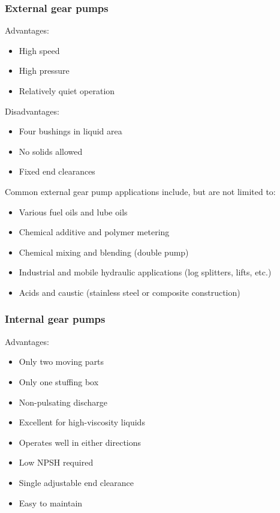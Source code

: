 \subsubsection{External gear pumps}

\noindent Advantages:
\begin{itemize}
\item High speed
\item High pressure
\item Relatively quiet operation
\end{itemize}

\noindent Disadvantages:
\begin{itemize}
\item Four bushings in liquid area
\item No solids allowed
\item Fixed end clearances
\end{itemize}

\noindent Common external gear pump applications include, but are not limited to:
\begin{itemize}
\item Various fuel oils and lube oils
\item Chemical additive and polymer metering
\item Chemical mixing and blending (double pump)
\item Industrial and mobile hydraulic applications (log splitters, lifts, etc.)
\item Acids and caustic (stainless steel or composite construction)
\end{itemize}

\subsubsection{Internal gear pumps}

\noindent Advantages:
\begin{itemize}
\item Only two moving parts
\item Only one stuffing box
\item Non-pulsating discharge
\item Excellent for high-viscosity liquids
\item Operates well in either directions
\item Low NPSH required
\item Single adjustable end clearance
\item Easy to maintain
\end{itemize}

